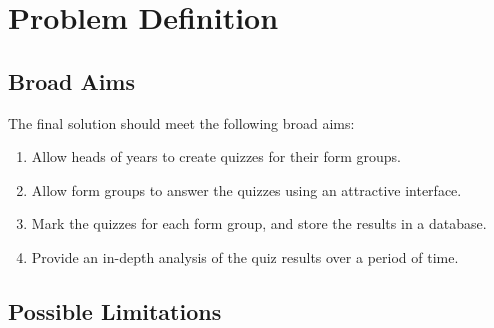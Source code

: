 \section{Problem Definition}

\subsection{Broad Aims}
The final solution should meet the following broad aims:

\begin{enumerate}
\item Allow heads of years to create quizzes for their form groups.
\item Allow form groups to answer the quizzes using an attractive interface.
\item Mark the quizzes for each form group, and store the results in a database.
\item Provide an in-depth analysis of the quiz results over a period of time.
\end{enumerate}

\subsection{Possible Limitations}
